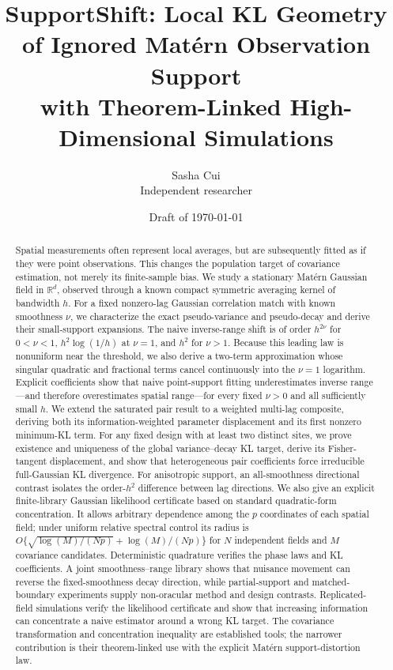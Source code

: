 \documentclass[11pt]{article}
\title{SupportShift: Local KL Geometry of Ignored Mat\'ern Observation Support\\
with Theorem-Linked High-Dimensional Simulations}
\author{Sasha Cui\\Independent researcher}
\date{Draft of \today}
\theoremstyle{remark}
\newcommand{\R}{\mathbb R}
\begin{document}
\maketitle

\begin{abstract}
Spatial measurements often represent local averages, but are subsequently
fitted as if they were point observations.  This changes the population target
of covariance estimation, not merely its finite-sample bias.  We study a
stationary Mat\'ern Gaussian field in \(\R^d\), observed through a known compact
symmetric averaging kernel of bandwidth \(h\).  For a fixed nonzero-lag
Gaussian correlation match with known smoothness \(\nu\), we characterize the
exact pseudo-variance and pseudo-decay and derive their small-support
expansions.  The naive inverse-range shift is of order \(h^{2\nu}\) for
\(0<\nu<1\), \(h^2\log(1/h)\) at \(\nu=1\), and \(h^2\) for \(\nu>1\).
Because this leading law is nonuniform near the threshold, we also derive a
two-term approximation whose singular quadratic and fractional terms cancel
continuously into the \(\nu=1\) logarithm.
Explicit coefficients show that naive point-support fitting underestimates
inverse range---and therefore overestimates spatial range---for every fixed
\(\nu>0\) and all sufficiently small \(h\). We extend the saturated pair result
to a weighted multi-lag composite, deriving both its information-weighted
parameter displacement and its first nonzero minimum-KL term. For any fixed
design with at least two distinct sites, we prove existence and uniqueness of
the global variance--decay KL target, derive its Fisher-tangent displacement,
and show that heterogeneous pair coefficients force irreducible full-Gaussian
KL divergence. For anisotropic support, an
all-smoothness directional contrast isolates the order-\(h^2\) difference
between lag directions.  We also give an explicit finite-library Gaussian
likelihood certificate based on standard quadratic-form concentration.  It
allows arbitrary dependence among the \(p\) coordinates of each spatial field;
under uniform relative spectral control its radius is
\(O\{\sqrt{\log(M)/(Np)}+\log(M)/(Np)\}\) for \(N\) independent fields and
\(M\) covariance candidates. Deterministic quadrature verifies the phase laws
and KL coefficients. A joint smoothness--range library shows that nuisance
movement can reverse the fixed-smoothness decay direction, while partial-support
and matched-boundary experiments supply non-oracular method and design
contrasts. Replicated-field simulations verify the
likelihood certificate and show that increasing information can concentrate a
naive estimator around a wrong KL target.  The covariance transformation and
concentration inequality are established tools; the narrower contribution is
their theorem-linked use with the explicit Mat\'ern support-distortion law.
\end{abstract}
\end{document}
